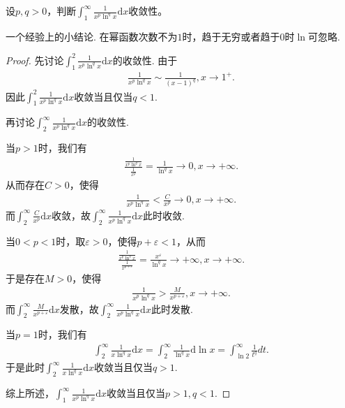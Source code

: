 \documentclass[../../main.tex]{subfiles}
\begin{document}
\begin{example}
设\(p,q > 0\)，判断\(\int_{1}^{\infty}\frac{1}{x^p\ln^q x}\mathrm{d}x\)收敛性。 
\end{example}
\begin{note}
一个经验上的小结论. 在幂函数次数不为\(1\)时，趋于无穷或者趋于\(0\)时\(\ln\)可忽略.
\end{note}
\begin{proof}
先讨论\(\int_{1}^{2}\frac{1}{x^p\ln ^q x}\mathrm{d}x\)的收敛性. 由于
\begin{align*}
\frac{1}{x^p\ln ^q x}\sim\frac{1}{(x - 1)^q},x\rightarrow 1^+.
\end{align*}
因此\(\int_{1}^{2}\frac{1}{x^p\ln ^q x}\mathrm{d}x\)收敛当且仅当\(q < 1\).

再讨论\(\int_{2}^{\infty}\frac{1}{x^p\ln ^q x}\mathrm{d}x\)的收敛性.

\one 当\(p > 1\)时，我们有
\begin{align*}
\frac{\frac{1}{x^p\ln ^q x}}{\frac{1}{x^p}}=\frac{1}{\ln ^q x}\rightarrow 0,x\rightarrow +\infty.
\end{align*}
从而存在\(C > 0\)，使得
\begin{align*}
\frac{1}{x^p\ln ^q x}<\frac{C}{x^p}\rightarrow 0,x\rightarrow +\infty.
\end{align*}
而\(\int_{2}^{\infty}\frac{C}{x^p}\mathrm{d}x\)收敛，故\(\int_{2}^{\infty}\frac{1}{x^p\ln ^q x}\mathrm{d}x\)此时收敛.

\two 当\(0 < p < 1\)时，取\(\varepsilon > 0\)，使得\(p + \varepsilon < 1\)，从而
\begin{align*}
\frac{\frac{1}{x^p\ln ^q x}}{\frac{1}{x^{p + \varepsilon}}}=\frac{x^{\varepsilon}}{\ln ^q x}\rightarrow +\infty,x\rightarrow +\infty.
\end{align*}
于是存在\(M > 0\)，使得
\begin{align*}
\frac{1}{x^p\ln ^q x}>\frac{M}{x^{p + \varepsilon}},x\rightarrow +\infty.
\end{align*}
而\(\int_{2}^{\infty}\frac{M}{x^{p + \varepsilon}}\mathrm{d}x\)发散，故\(\int_{2}^{\infty}\frac{1}{x^p\ln ^q x}\mathrm{d}x\)此时发散.

\three 当\(p = 1\)时，我们有
\begin{align*}
\int_{2}^{\infty}\frac{1}{x\ln ^q x}\mathrm{d}x=\int_{2}^{\infty}\frac{1}{\ln ^q x}\mathrm{d}\ln x=\int_{\ln 2}^{\infty}\frac{1}{t^q}dt.
\end{align*}
于是此时\(\int_{2}^{\infty}\frac{1}{x\ln ^q x}\mathrm{d}x\)收敛当且仅当\(q > 1\).

综上所述，\(\int_{1}^{\infty}\frac{1}{x^p\ln ^q x}\mathrm{d}x\)收敛当且仅当\(p > 1,q < 1\). 
\end{proof}
\end{document}
